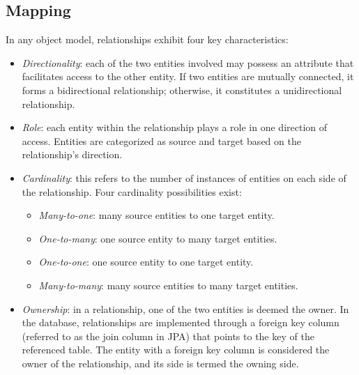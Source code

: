 \subsection{Mapping}
In any object model, relationships exhibit four key characteristics:
\begin{itemize}
    \item \textit{Directionality}: each of the two entities involved may possess an attribute that facilitates access to the other entity. 
        If two entities are mutually connected, it forms a bidirectional relationship; otherwise, it constitutes a unidirectional relationship.
    \item \textit{Role}: each entity within the relationship plays a role in one direction of access. 
        Entities are categorized as source and target based on the relationship's direction.
    \item \textit{Cardinality}: this refers to the number of instances of entities on each side of the relationship.
        Four cardinality possibilities exist:
        \begin{itemize}
            \item \textit{Many-to-one}: many source entities to one target entity.
            \item \textit{One-to-many}: one source entity to many target entities.
            \item \textit{One-to-one}: one source entity to one target entity.
            \item \textit{Many-to-many}: many source entities to many target entities.
        \end{itemize}
    \item \textit{Ownership}: in a relationship, one of the two entities is deemed the owner. 
        In the database, relationships are implemented through a foreign key column (referred to as the join column in JPA) that points to the key of the referenced table. 
        The entity with a foreign key column is considered the owner of the relationship, and its side is termed the owning side.
\end{itemize}

